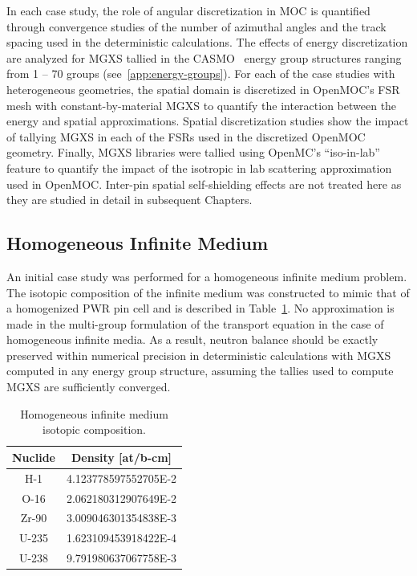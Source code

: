 In each case study, the role of angular discretization in \ac{MOC} is quantified through convergence studies of the number of azimuthal angles and the track spacing used in the deterministic calculations. The effects of energy discretization are analyzed for \ac{MGXS} tallied in the CASMO~\cite{rhodes2006casmo} energy group structures ranging from 1 -- 70 groups (see~\ref{app:energy-groups}). For each of the case studies with heterogeneous geometries, the spatial domain is discretized in OpenMOC's \ac{FSR} mesh with constant-by-material \ac{MGXS} to quantify the interaction between the energy and spatial approximations. Spatial discretization studies show the impact of tallying \ac{MGXS} in each of the \ac{FSR}s used in the discretized OpenMOC geometry. Finally, \ac{MGXS} libraries were tallied using OpenMC's ``iso-in-lab'' feature to quantify the impact of the isotropic in lab scattering approximation used in OpenMOC. Inter-pin spatial self-shielding effects are not treated here as they are studied in detail in subsequent Chapters.

\subsection{Homogeneous Infinite Medium}
\label{subsec:chap4-inf-medium}

An initial case study was performed for a homogeneous infinite medium problem. The isotopic composition of the infinite medium was constructed to mimic that of a homogenized \ac{PWR} pin cell and is described in Table~\ref{table:chap4-inf-med-isotopes}. No approximation is made in the multi-group formulation of the transport equation in the case of homogeneous infinite media. As a result, neutron balance should be exactly preserved within numerical precision in deterministic calculations with \ac{MGXS} computed in any energy group structure, assuming the tallies used to compute \ac{MGXS} are sufficiently converged.

\begin{table}[h!]
  \centering
  \caption{Homogeneous infinite medium isotopic composition.}
  \small
  \label{table:chap4-inf-med-isotopes} 
  \vspace{6pt}
  \begin{tabular}{c c}
  \toprule
  \multicolumn{1}{c}{\bf Nuclide} &
  \multicolumn{1}{c}{\bf Density [at/b-cm]} \\
  \midrule
  H-1 &   4.123778597552705E-2 \\
  O-16 &  2.062180312907649E-2 \\
  Zr-90 & 3.009046301354838E-3 \\
  U-235 & 1.623109453918422E-4 \\
  U-238 & 9.791980637067758E-3 \\
  \bottomrule
\end{tabular}
\end{table}


